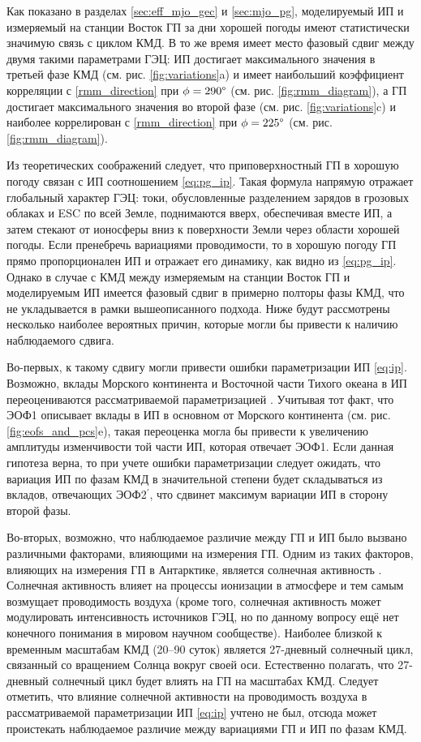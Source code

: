 Как показано в разделах \ref{sec:eff_mjo_gec} и \ref{sec:mjo_pg}, моделируемый ИП и измеряемый на станции Восток ГП за дни хорошей погоды имеют статистически значимую связь с циклом КМД. В то же время имеет место фазовый сдвиг между двумя такими параметрами ГЭЦ: ИП достигает максимального значения в третьей фазе КМД (см. рис. \ref{fig:variations}{a}) и имеет наибольший коэффициент корреляции с \eqref{rmm_direction} при $\phi = 290\text{\textdegree}$ (см. рис. \ref{fig:rmm_diagram}), а ГП достигает максимального значения во второй фазе (см. рис. \ref{fig:variations}{c}) и наиболее коррелирован с \eqref{rmm_direction} при $\phi = 225\text{\textdegree}$ (см. рис. \ref{fig:rmm_diagram}). 

Из теоретических соображений следует, что приповерхностный ГП в хорошую погоду связан с ИП соотношением \eqref{eq:pg_ip}. Такая формула напрямую отражает глобальный характер ГЭЦ: токи, обусловленные разделением зарядов в грозовых облаках и ESC по всей Земле, поднимаются вверх, обеспечивая вместе ИП, а затем стекают от ионосферы вниз к поверхности Земли через области хорошей погоды. Если пренебречь вариациями проводимости, то в хорошую погоду ГП прямо пропорционален ИП и отражает его динамику, как видно из \eqref{eq:pg_ip}. Однако в случае с КМД между измеряемым на станции Восток ГП и моделируемым ИП имеется фазовый сдвиг в примерно полторы фазы КМД, что не укладывается в рамки вышеописанного подхода. Ниже будут рассмотрены несколько наиболее вероятных причин, которые могли бы привести к наличию наблюдаемого сдвига.

Во-первых, к такому сдвигу могли привести ошибки параметризации ИП \eqref{eq:ip}. Возможно, вклады Морского континента и Восточной части Тихого океана в ИП переоцениваются рассматриваемой параметризацией \cite{Ilin_et_al_2020}. Учитывая тот факт, что ЭОФ1 описывает вклады в ИП в основном от Морского континента (см. рис. \ref{fig:eofs_and_pcs}{e}), такая переоценка могла бы привести к увеличению амплитуды изменчивости той части ИП, которая отвечает ЭОФ1. Если данная гипотеза верна, то при учете ошибки параметризации следует ожидать, что вариация ИП по фазам КМД в значительной степени будет складываться из вкладов, отвечающих ЭОФ2$^\prime$, что сдвинет максимум вариации ИП в сторону второй фазы.

Во-вторых, возможно, что наблюдаемое различие между ГП и ИП было вызвано различными факторами, влияющими на измерения ГП. Одним из таких факторов, влияющих на измерения ГП в Антарктике, является солнечная активность \cite{Burns_et_al_2017}. Солнечная активность влияет на процессы ионизации в атмосфере и тем самым возмущает проводимость воздуха (кроме того, солнечная активность может модулировать интенсивность источников ГЭЦ, но по данному вопросу ещё нет конечного понимания в мировом научном сообществе). Наиболее близкой к временным масштабам КМД (20--90 суток) является 27-дневный солнечный цикл, связанный со вращением Солнца вокруг своей оси. Естественно полагать, что 27-дневный солнечный цикл будет влиять на ГП на масштабах КМД. Следует отметить, что влияние солнечной активности на проводимость воздуха в рассматриваемой параметризации ИП \eqref{eq:ip} учтено не был, отсюда может проистекать наблюдаемое различие между вариациями ГП и ИП по фазам КМД.

